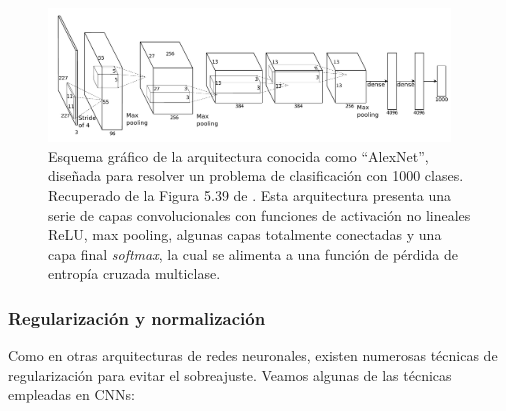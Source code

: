 \begin{figure}[h]
    \centering
    \includegraphics[width=0.95\textwidth]{capitulos/cap_02/imagenes/CNN_complete.png}
    \caption[
        Esquema gráfico de la arquitectura conocida como ``AlexNet'', diseñada para resolver un problema
        de clasificación con 1000 clases.
        Recuperado de la Figura 5.39 de \cite{szeliski2010}.
    ]{
        Esquema gráfico de la arquitectura conocida como ``AlexNet'', diseñada para resolver un problema
        de clasificación con 1000 clases.
        Recuperado de la Figura 5.39 de \cite{szeliski2010}.
        Esta arquitectura presenta una serie de capas convolucionales con funciones de activación no lineales 
        ReLU, max pooling, algunas capas totalmente conectadas y una capa final \textit{softmax}, la cual se 
        alimenta a una función de pérdida de entropía cruzada multiclase.
    } 
    \label{fig:CNN_complete}
\end{figure}


\subsubsection{Regularización y normalización}

Como en otras arquitecturas de redes neuronales, existen numerosas técnicas de regularización para evitar
el sobreajuste. Veamos algunas de las técnicas empleadas en CNNs:

